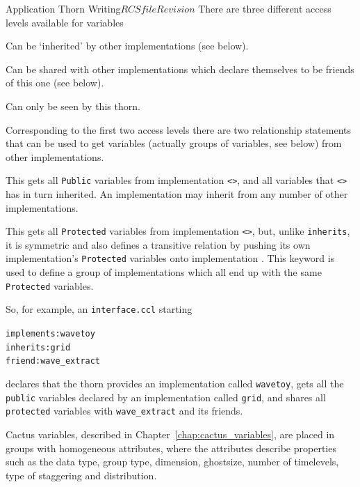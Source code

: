 \begin{cactuspart}{Application Thorn Writing}{$RCSfile$}{$Revision$}
There are three different access levels available for variables

\begin{Lentry}
\item[\texttt{Public}]
Can be `inherited' by other implementations (see below).
\item[\texttt{Protected}]
Can be shared with other implementations which declare themselves to
be friends of this one (see below).
\item[\texttt{Private}]
Can only be seen by this thorn.
\end{Lentry}

Corresponding to the first two access levels there are two relationship
statements that can be used to get variables (actually groups of variables,
see below) from other implementations.

\begin{Lentry}
\item [\texttt{Inherits: <\var{name}>}]
This gets all \texttt{Public} variables from implementation \texttt{<>}, and all
variables that \texttt{<>} has in turn inherited.
An implementation may inherit from any number of other implementations.
\item [\texttt{Friend: <\var{name}>}]
This gets all \texttt{Protected} variables from implementation \texttt{<>}, but,
unlike \texttt{inherits}, it is symmetric and also defines a transitive relation by
pushing its own implementation's \texttt{Protected} variables onto implementation
.  This keyword is used to define a group of implementations which
all end up with the same \texttt{Protected} variables.
\end{Lentry}

So, for example, an \texttt{interface.ccl} starting
\begin{alltt}
implements: wavetoy
inherits:   grid
friend:     wave_extract
\end{alltt}
declares that the thorn provides an implementation called \texttt{wavetoy}, gets
all the \texttt{public} variables declared by an implementation called \texttt{grid},
and shares all \texttt{protected} variables with \texttt{wave\_extract} and its
friends.

Cactus variables, described in Chapter~\ref{chap:cactus_variables}, are placed
in groups with homogeneous attributes, where
the attributes describe properties such as the data type, group type,
dimension, ghostsize, number of timelevels, type of staggering and
distribution.


\end{cactuspart}
